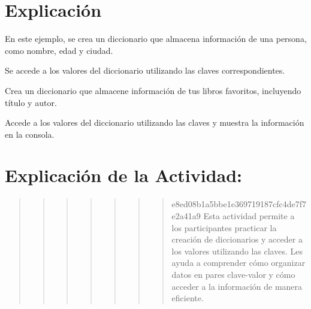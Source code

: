 \documentclass[
  a4paper,
  DIV=11,
  numbers=noendperiod,
  onepage,
  openany]{scrreprt}
\begin{document}
\hypertarget{explicaciuxf3n-25}{%
\section{Explicación}\label{explicaciuxf3n-25}}

En este ejemplo, se crea un diccionario que almacena información de una
persona, como nombre, edad y ciudad.

Se accede a los valores del diccionario utilizando las claves
correspondientes.

\begin{tcolorbox}[enhanced jigsaw, colbacktitle=quarto-callout-important-color!10!white, toprule=.15mm, leftrule=.75mm, titlerule=0mm, opacityback=0, rightrule=.15mm, opacitybacktitle=0.6, breakable, left=2mm, coltitle=black, title=\textcolor{quarto-callout-important-color}{\faExclamation}\hspace{0.5em}{Actividad Práctica}, toptitle=1mm, bottomtitle=1mm, arc=.35mm, bottomrule=.15mm, colback=white, colframe=quarto-callout-important-color-frame]

Crea un diccionario que almacene información de tus libros favoritos,
incluyendo título y autor.

Accede a los valores del diccionario utilizando las claves y muestra la
información en la consola.

\end{tcolorbox}

\hypertarget{explicaciuxf3n-de-la-actividad-23}{%
\section{Explicación de la
Actividad:}\label{explicaciuxf3n-de-la-actividad-23}}

\begin{quote}
\begin{quote}
\begin{quote}
\begin{quote}
\begin{quote}
\begin{quote}
\begin{quote}
e8ed08b1a5bbe1e369719187cfc4de7f7e2a41a9 Esta actividad permite a los
participantes practicar la creación de diccionarios y acceder a los
valores utilizando las claves. Les ayuda a comprender cómo organizar
datos en pares clave-valor y cómo acceder a la información de manera
eficiente.
\end{quote}
\end{quote}
\end{quote}
\end{quote}
\end{quote}
\end{quote}
\end{quote}
\end{document}
